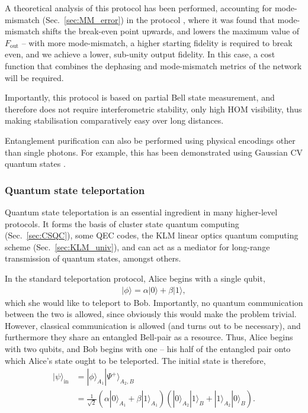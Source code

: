 \documentclass[aps, rmp, twocolumn, amsmath, amssymb, nofootinbib, superscriptaddress, longbibliography, floatfix, table-of-contents, eqsecnum]{revtex4-1}
\newcommand{\ket}[1]{|#1\rangle}
\begin{document}
A theoretical analysis of this protocol has been performed, accounting for mode-mismatch (Sec.~\ref{sec:MM_error}) in the protocol \cite{bib:RohdeOptEntPur06}, where it was found that mode-mismatch shifts the break-even point upwards, and lowers the maximum value of $F_\text{out}$ -- with more mode-mismatch, a higher starting fidelity is required to break even, and we achieve a lower, sub-unity output fidelity. In this case, a cost function that combines the dephasing and mode-mismatch metrics of the network will be required.

Importantly, this protocol is based on partial Bell state measurement, and therefore does not require interferometric stability, only high HOM visibility, thus making stabilisation comparatively easy over long distances.

Entanglement purification can also be performed using physical encodings other than single photons. For example, this has been demonstrated using Gaussian CV quantum states \cite{bib:Duan00}.

%
%

\subsubsection{Quantum state teleportation} \label{sec:teleport} 

Quantum state teleportation \cite{???, bib:PRL_70_1895} is an essential ingredient in many higher-level protocols. It forms the basis of cluster state quantum computing (Sec.~\ref{sec:CSQC}), some QEC codes, the KLM linear optics quantum computing scheme (Sec.~\ref{sec:KLM_univ}), and can act as a mediator for long-range transmission of quantum states, amongst others.

In the standard teleportation protocol, Alice begins with a single qubit,
\begin{align}
\ket\phi = \alpha\ket{0} +\beta\ket{1},
\end{align}
which she would like to teleport to Bob. Importantly, no quantum communication between the two is allowed, since obviously this would make the problem trivial. However, classical communication is allowed (and turns out to be necessary), and furthermore they share an entangled Bell-pair as a resource. Thus, Alice begins with two qubits, and Bob begins with one -- his half of the entangled pair onto which Alice's state ought to be teleported. The initial state is therefore,
\begin{align}
\ket\psi_\text{in} &= \ket{\phi}_{A_1} \ket{\Psi^+}_{A_2,B} \\
&= \frac{1}{\sqrt{2}} (\alpha\ket{0}_{A_1}+\beta\ket{1}_{A_1}) (\ket{0}_{A_2}\ket{1}_B + \ket{1}_{A_2}\ket{0}_B). \nonumber
\end{align}
\end{document}
